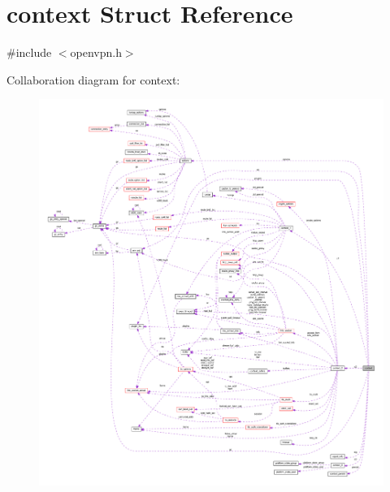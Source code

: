 \hypertarget{structcontext}{}\section{context Struct Reference}
\label{structcontext}


{\ttfamily \#include $<$openvpn.\+h$>$}



Collaboration diagram for context\+:
\nopagebreak
\begin{figure}[H]
\begin{center}
\leavevmode
\includegraphics[width=350pt]{structcontext__coll__graph}
\end{center}
\end{figure}
